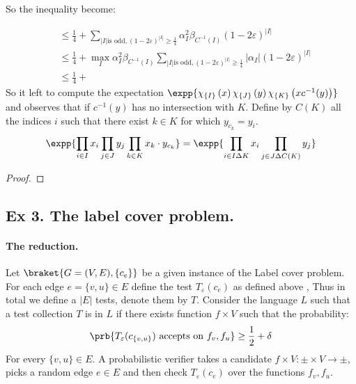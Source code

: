 \documentclass{article}
\newcommand{\Chi}[1]{\chi_{ \left\{ #1  \right\} } }
\begin{document}
So the inequality become:  

\begin{equation*}
  \begin{split}
    & \le \frac{1}{4} +  \sum_{|I| \text{is odd}, (1-2\varepsilon)^{|I|} \ge \frac{1}{4} }{\alpha_{I}^{2}\beta_{C^{-1}(I)}  \left( 1 -2 \varepsilon \right)^{|I|}} \\
    & \le \frac{1}{4} +  \max_{I} \alpha_{I}^{2}\beta_{C^{-1}(I)}  \sum_{|I| \text{is odd}, (1-2\varepsilon)^{|I|} \ge \frac{1}{4} }{|\alpha_{I}|  \left( 1 -2 \varepsilon \right)^{|I|}} \\ 
    & \le \frac{1}{4} + 
  \end{split}
\end{equation*}
So it left to compute the expectation $ \expp{ \Chi{I}\left( x \right)\Chi{J}\left( y \right) \Chi{K}\left( x c^{-1}(y) \right) }$ and observes that if $c^{-1}(y)$ has no intersection with $K$. Define by $C(K)$ all the indices $i$ such that there exist $ k \in K$ for which $y_{c_{k}} = y_{i}$. 
\begin{equation*}
  \begin{split}
    \expp{\prod_{i \in I}{ x_{i}} \prod_{j \in J}{ y_{j}} \prod_{k \in K }{ x_{k}\cdot y_{c_{k}}} } = \expp{\prod_{i \in I \Delta K }{ x_{i}} \prod_{j \in J \Delta C(K) }{ y_{j}}}
  \end{split}
\end{equation*}
\begin{proof}
\end{proof}


\subsection{Ex 3. The label cover problem.} 
\paragraph{The reduction.} Let $\braket{G=(V,E), \{ c_{e} \} }$ be a given instance of the Label cover problem. For each edge $e = \{v,u\} \in E$ define the test $T_{\varepsilon}\left( c_{e} \right)$ as defined above , Thus in total we define a $|E|$ tests, denote them by $T$. Consider the language $L$ such that a test collection $T$ is in $L$ if there exists function $f \times V$ such that the probability:  
\begin{equation*}
  \begin{split}
    \prb{T_{\varepsilon}(c_{ \{ v,u\} }) \text{ accepts on } f_{v},f_{u} } \ge \frac{1}{2} + \delta
  \end{split}
\end{equation*}
For every $\{v, u\} \in E$. A probabilistic verifier takes a candidate $f\times V : \pm  \times V \rightarrow \pm$, picks a random edge $e \in E$ and then check $T_{\varepsilon}\left( c_{e} \right)$ over the functions $f_{v},f_{u}$.    
\end{document}
